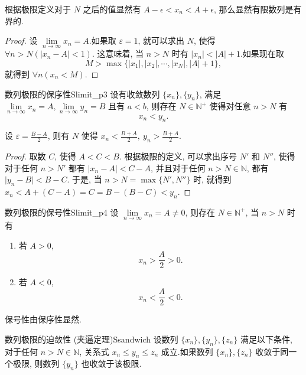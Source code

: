 \documentclass[cn,toc=twocol]{elegantbook}
\newcommand{\ITEMS}{\begin{enumerate}}
\newcommand{\ITEME}{\end{enumerate}}
\newcommand{\N}{\mathbb{N}}
\begin{document}
\begin{idea*}
根据极限定义对于 $N$ 之后的值显然有 $A - \epsilon < x_n < A + \epsilon$, 那么显然有限数列是有界的.
\end{idea*}

\begin{proof}
	设 $\lim\limits_{n\to\infty} x_n = A$.如果取 $\varepsilon = 1$, 就可以求出 $N$, 使得 $\forall n > N (\lvert x_n - A \rvert < 1)$. 这意味着, 当 $n > N$ 时有 $\lvert x_n \rvert < \lvert A \rvert + 1$.如果现在取
	\[
		M > \max\{\lvert x_1\rvert, \lvert x_2\rvert, \cdots, \lvert x_N\rvert, \lvert A\rvert + 1\},
	\]
	就得到 $\forall n (x_n < M)$.
\end{proof}
\smallskip

\begin{theorem}{数列极限的保序性}{Slimit_p3}
设有收敛数列 $\{x_n\},\{y_n\}$, 满足 $\lim\limits_{n\to\infty} x_n = A, \lim\limits_{n\to\infty} y_n = B$ 且有 $a < b$, 则存在 $N \in \N^+$ 使得对任意 $n > N$ 有
\[
	x_n < y_n.
\]

\end{theorem}
\begin{idea*}
设 $\varepsilon = \frac{B - A}{2}$, 则有 $N$ 使得 $x_n < \frac{B + A}{2},\ y_n > \frac{B + A}{2}$.
\end{idea*}
\begin{proof}
	取数 $C$, 使得 $A < C < B$. 根据极限的定义, 可以求出序号 $N'$ 和 $N''$, 使得对于任何 $n>N'$ 都有 $\lvert x_n - A \rvert < C - A$, 并且对于任何 $n > N \in \N$, 都有 $\lvert y_n - B \rvert < B - C$. 于是, 当 $n>N = \max\{N',N''\}$ 时, 就得到 $x_n < A + (C - A) = C = B - (B- C) < y_n$.
\end{proof}
\smallskip

\begin{corollary}{数列极限的保号性}{Slimit_p4}
	设 $\lim\limits_{n\to\infty} x_n = A \neq 0$, 则存在 $N \in \N^+$, 当 $n > N$ 时有
	\ITEMS
		\item 若 $A > 0$,
		\[
			x_n > \frac A2 > 0.
		\]
		\item 若 $A < 0$,
		\[
			x_n < \frac A2 < 0.
		\]
	\ITEME
\end{corollary}

保号性由保序性显然.
\smallskip

\begin{theorem}{数列极限的迫敛性 (夹逼定理)}{Ssandwich}
设数列 $\{x_n\}, \{y_n\}, \{z_n\}$ 满足以下条件, 对于任何 $n > N \in \N$, 关系式 $x_n \le y_n \le z_n$ 成立.如果数列 $\{x_n\}, \{z_n\}$ 收敛于同一个极限, 则数列 $\{y_n\}$ 也收敛于该极限. 
\end{theorem}
\end{document}
